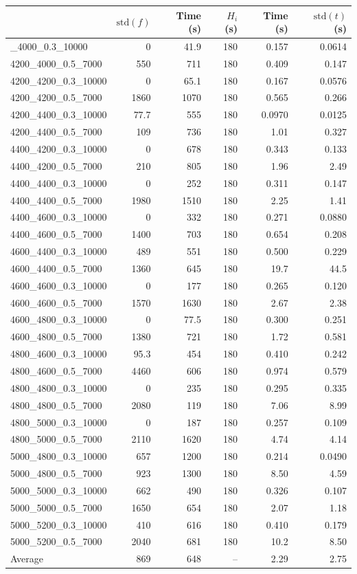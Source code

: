 \begin{landscape}
\begin{longtable}{lrrrrr}
 & $\mathrm{std}(f)$ & Time (s) & $H_i$ (s) & Time (s) & $\mathrm{std}(t)$ (s)\\
\midrule\endhead
\bottomrule\endlastfoot
4200\_4000\_0.3\_10000 & 0 & 41.9 & 180 & 0.157 & 0.0614\\
4200\_4000\_0.5\_7000 & 550 & 711 & 180 & 0.409 & 0.147\\
4200\_4200\_0.3\_10000 & 0 & 65.1 & 180 & 0.167 & 0.0576\\
4200\_4200\_0.5\_7000 & 1860 & 1070 & 180 & 0.565 & 0.266\\
4200\_4400\_0.3\_10000 & 77.7 & 555 & 180 & 0.0970 & 0.0125\\
4200\_4400\_0.5\_7000 & 109 & 736 & 180 & 1.01 & 0.327\\
4400\_4200\_0.3\_10000 & 0 & 678 & 180 & 0.343 & 0.133\\
4400\_4200\_0.5\_7000 & 210 & 805 & 180 & 1.96 & 2.49\\
4400\_4400\_0.3\_10000 & 0 & 252 & 180 & 0.311 & 0.147\\
4400\_4400\_0.5\_7000 & 1980 & 1510 & 180 & 2.25 & 1.41\\
4400\_4600\_0.3\_10000 & 0 & 332 & 180 & 0.271 & 0.0880\\
4400\_4600\_0.5\_7000 & 1400 & 703 & 180 & 0.654 & 0.208\\
4600\_4400\_0.3\_10000 & 489 & 551 & 180 & 0.500 & 0.229\\
4600\_4400\_0.5\_7000 & 1360 & 645 & 180 & 19.7 & 44.5\\
4600\_4600\_0.3\_10000 & 0 & 177 & 180 & 0.265 & 0.120\\
4600\_4600\_0.5\_7000 & 1570 & 1630 & 180 & 2.67 & 2.38\\
4600\_4800\_0.3\_10000 & 0 & 77.5 & 180 & 0.300 & 0.251\\
4600\_4800\_0.5\_7000 & 1380 & 721 & 180 & 1.72 & 0.581\\
4800\_4600\_0.3\_10000 & 95.3 & 454 & 180 & 0.410 & 0.242\\
4800\_4600\_0.5\_7000 & 4460 & 606 & 180 & 0.974 & 0.579\\
4800\_4800\_0.3\_10000 & 0 & 235 & 180 & 0.295 & 0.335\\
4800\_4800\_0.5\_7000 & 2080 & 119 & 180 & 7.06 & 8.99\\
4800\_5000\_0.3\_10000 & 0 & 187 & 180 & 0.257 & 0.109\\
4800\_5000\_0.5\_7000 & 2110 & 1620 & 180 & 4.74 & 4.14\\
5000\_4800\_0.3\_10000 & 657 & 1200 & 180 & 0.214 & 0.0490\\
5000\_4800\_0.5\_7000 & 923 & 1300 & 180 & 8.50 & 4.59\\
5000\_5000\_0.3\_10000 & 662 & 490 & 180 & 0.326 & 0.107\\
5000\_5000\_0.5\_7000 & 1650 & 654 & 180 & 2.07 & 1.18\\
5000\_5200\_0.3\_10000 & 410 & 616 & 180 & 0.410 & 0.179\\
5000\_5200\_0.5\_7000 & 2040 & 681 & 180 & 10.2 & 8.50\\
\midrule
Average & 869 & 648 & -- & 2.29 & 2.75\\
\end{longtable}\clearpage
\end{landscape}

